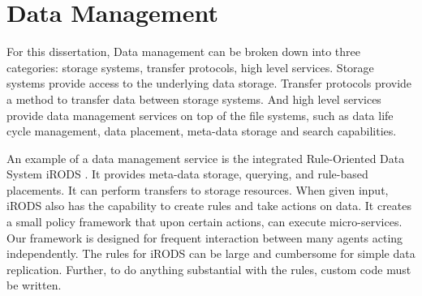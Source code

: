 






\section{Data Management}


For this dissertation, Data management can be broken down into three categories: storage systems, transfer protocols, high level services.  Storage systems provide access to the underlying data storage.  Transfer protocols provide a method to transfer data between storage systems.  And high level services provide data management services on top of the file systems, such as data life cycle management, data placement, meta-data storage and search capabilities.

An example of a data management service is the integrated Rule-Oriented Data System iRODS \cite{rajasekar2010irods}.  It provides meta-data storage, querying, and rule-based placements.  It can perform transfers to storage resources.  When given input, iRODS also has the capability to create rules and take actions on data.  It creates a small policy framework that upon certain actions, can execute micro-services.  Our framework is designed for frequent interaction between many agents acting independently.  The rules for iRODS can be large and cumbersome for simple data replication.  Further, to do anything substantial with the rules, custom code must be written.

